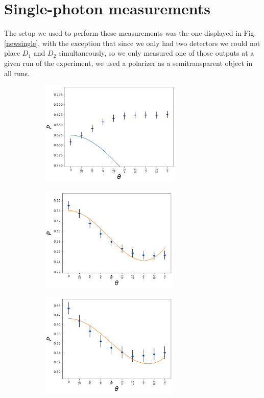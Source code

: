 \documentclass[12pt]{book}
\begin{document}
\section{Single-photon measurements}

The setup we used to perform these measurements was the one displayed in Fig. \ref{newsingle}, with the exception that since we only had two detectors we could not place $D_{1}$ and $D_{2}$ simultaneously, so we only measured one of those outputs at a given run of the experiment, we used a polarizer as a semitransparent object in all runs.

\begin{figure}[t!]
\centering
\begin{subfigure}[b]{0.45\linewidth}
\includegraphics[width=\linewidth,height=5cm]{images/ajuste_miercoles_11.png}
\caption{}
\end{subfigure}
\begin{subfigure}[b]{0.45\linewidth}
\includegraphics[width=\linewidth,height=5cm]{images/ajuste_miercoles_21.png}
\caption{}
\end{subfigure}
\begin{subfigure}[b]{0.45\linewidth}
\includegraphics[width=\linewidth,height=5cm]{images/ajuste_miercoles_12.png}

\end{subfigure}
\end{figure}
\end{document}
